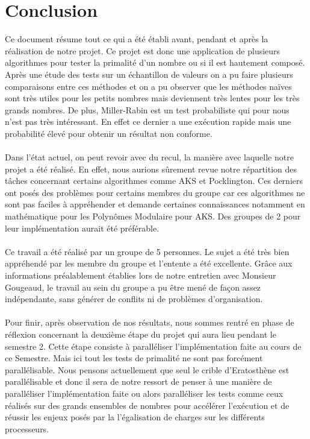 	\section{Conclusion}
	
	Ce document résume tout ce qui a été établi avant, pendant et après la réalisation de notre projet. Ce projet est donc une application de plusieurs algorithmes pour tester la primalité d'un nombre ou si il est hautement composé. Après une étude des tests sur un échantillon de valeurs on a pu faire plusieurs comparaisons entre ces méthodes et on a pu observer que les méthodes naïves sont très utiles pour les petits nombres mais deviennent très lentes pour les très grands nombres. De plus, Miller-Rabin est un test probabiliste qui pour nous n'est pas très intéressant. En effet ce dernier a une exécution rapide mais une probabilité élevé pour obtenir un résultat non conforme.
		\paragraph{} Dans l'état actuel, on peut revoir avec du recul, la manière avec laquelle notre projet a été réalisé. En effet, nous aurions sûrement revue notre répartition des tâches concernant certains algorithmes comme AKS et Pocklington. Ces derniers ont posés des problèmes pour certains membres du groupe car ces algorithmes ne sont pas faciles à appréhender et demande certaines connaissances notamment en mathématique pour les Polynômes Modulaire pour AKS. Des groupes de 2 pour leur implémentation aurait été préférable.
		\paragraph{} Ce travail a été réalisé par un groupe de 5 personnes. Le sujet a été très bien appréhendé par les membre du groupe et l'entente a été excellente. Grâce aux informations préalablement établies lors de notre entretien avec Monsieur Gougeaud, le travail au sein du groupe a pu être mené de façon assez indépendante, sans générer de conflits ni de problèmes d'organisation.		
		\paragraph{} Pour finir, après observation de nos résultats, nous sommes rentré en phase de réflexion concernant la deuxième étape du projet qui aura lieu pendant le semestre 2. Cette étape consiste à paralléliser l'implémentation faite au cours de ce Semestre. Mais ici tout les tests de primalité ne sont pas forcément parallélisable. Nous pensons actuellement que seul le crible d'Eratosthène est parallélisable et donc il sera de notre ressort de penser à une manière de paralléliser l'implémentation faite ou alors paralléliser les tests comme ceux réalisés sur des grands ensembles de nombres pour accélérer l'exécution et de réussir les enjeux posés par la l'égalisation de charges sur les différents processeurs.


